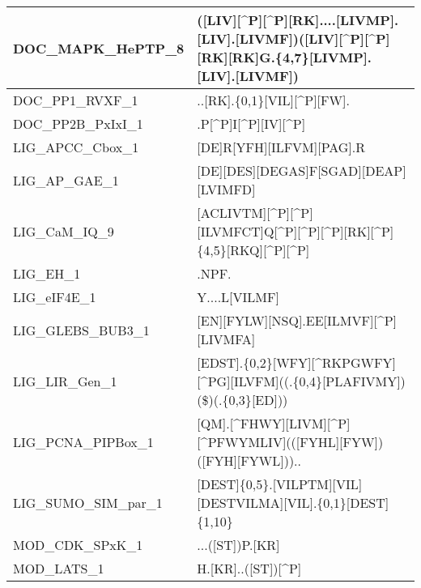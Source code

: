 \begin{landscape}
\begin{longtable}{|l|l|}
\hline
DOC\_MAPK\_HePTP\_8    & ([LIV][\^{}P][\^{}P][RK]....[LIVMP].[LIV].[LIVMF])\textbar{}([LIV][\^{}P][\^{}P][RK][RK]G.\{4,7\}{[}LIVMP].[LIV].[LIVMF])  \\
\hline
DOC\_PP1\_RVXF\_1      & ..[RK].\{0,1\}{[}VIL][\^{}P][FW].                                                                                          \\
\hline
DOC\_PP2B\_PxIxI\_1    & .P[\^{}P]I[\^{}P][IV][\^{}P]                                                                                               \\
\hline
LIG\_APCC\_Cbox\_1     & {[}DE]R[YFH][ILFVM][PAG].R                                                                                                 \\
\hline
LIG\_AP\_GAE\_1        & {[}DE][DES][DEGAS]F[SGAD][DEAP][LVIMFD]                                                                                    \\
\hline
LIG\_CaM\_IQ\_9        & {[}ACLIVTM][\^{}P][\^{}P][ILVMFCT]Q[\^{}P][\^{}P][\^{}P][RK][\^{}P]\{4,5\}{[}RKQ][\^{}P][\^{}P]                            \\
\hline
LIG\_EH\_1             & .NPF.                                                                                                                      \\
\hline
LIG\_eIF4E\_1          & Y....L[VILMF]                                                                                                              \\
\hline
LIG\_GLEBS\_BUB3\_1    & {[}EN][FYLW][NSQ].EE[ILMVF][\^{}P][LIVMFA]                                                                                 \\
\hline
LIG\_LIR\_Gen\_1       & {[}EDST].\{0,2\}{[}WFY][\^{}RKPGWFY][\^{}PG][ILVFM]((.\{0,4\}{[}PLAFIVMY])\textbar{}(\$)\textbar{}(.\{0,3\}{[}ED]))        \\
\hline
LIG\_PCNA\_PIPBox\_1   & {[}QM].[\^{}FHWY][LIVM][\^{}P][\^{}PFWYMLIV](([FYHL][FYW])\textbar{}([FYH][FYWL]))..                                       \\
\hline
LIG\_SUMO\_SIM\_par\_1 & {[}DEST]\{0,5\}.[VILPTM][VIL][DESTVILMA][VIL].\{0,1\}{[}DEST]\{1,10\}                                                      \\
\hline
MOD\_CDK\_SPxK\_1      & ...([ST])P.[KR]                                                                                                            \\
\hline
MOD\_LATS\_1           & H.[KR]..([ST])[\^{}P]                                                                                                      \\

\end{longtable}
\end{landscape}
